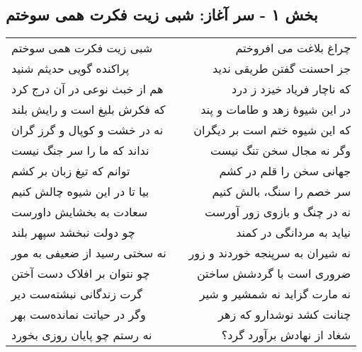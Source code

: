 \begin{center}
\section*{بخش ۱ - سر آغاز: شبی زیت فکرت همی سوختم}
\label{sec:001}
\begin{longtable}{l p{0.5cm} r}
شبی زیت فکرت همی سوختم
&&
چراغ بلاغت می افروختم
\\
پراکنده گویی حدیثم شنید
&&
جز احسنت گفتن طریقی ندید
\\
هم از خبث نوعی در آن درج کرد
&&
که ناچار فریاد خیزد ز درد
\\
که فکرش بلیغ است و رایش بلند
&&
در این شیوهٔ زهد و طامات و پند
\\
نه در خشت و کوپال و گرز گران
&&
که این شیوه ختم است بر دیگران
\\
نداند که ما را سر جنگ نیست
&&
وگر نه مجال سخن تنگ نیست
\\
توانم که تیغ زبان بر کشم
&&
جهانی سخن را قلم در کشم
\\
بیا تا در این شیوه چالش کنیم
&&
سر خصم را سنگ، بالش کنیم
\\
سعادت به بخشایش داورست
&&
نه در چنگ و بازوی زور آورست
\\
چو دولت نبخشد سپهر بلند
&&
نیاید به مردانگی در کمند
\\
نه سختی رسید از ضعیفی به مور
&&
نه شیران به سرپنجه خوردند و زور
\\
چو نتوان بر افلاک دست آختن
&&
ضروری است با گردشش ساختن
\\
گرت زندگانی نبشته‌ست دیر
&&
نه مارت گزاید نه شمشیر و شیر
\\
وگر در حیاتت نمانده‌ست بهر
&&
چنانت کشد نوشدارو که زهر
\\
نه رستم چو پایان روزی بخورد
&&
شغاد از نهادش برآورد گرد؟
\\
\end{longtable}
\end{center}
